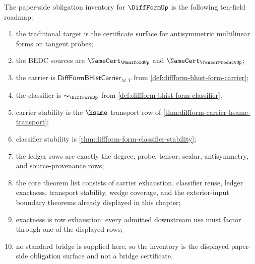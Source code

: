 \begin{definition}
\label{def:diffform-obligation-inventory}
The paper-side obligation inventory for $\DiffFormUp$ is the following
ten-field roadmap:
\begin{enumerate}
  \item the traditional target is the certificate surface for antisymmetric
  multilinear forms on tangent probes;
  \item the BEDC sources are $\NameCert_{\ManifoldUp}$ and
  $\NameCert_{\TensorProductUp}$;
  \item the carrier is
  $\mathsf{DiffFormBHistCarrier}_{M,T}$ from
  \autoref{def:diffform-bhist-form-carrier};
  \item the classifier is $\sim_{\DiffFormUp}$ from
  \autoref{def:diffform-bhist-form-classifier};
  \item carrier stability is the $\hsame$ transport row of
  \autoref{thm:diffform-carrier-hsame-transport};
  \item classifier stability is
  \autoref{thm:diffform-form-classifier-stability};
  \item the ledger rows are exactly the degree, probe, tensor, scalar,
  antisymmetry, and source-provenance rows;
  \item the core theorem list consists of carrier exhaustion, classifier
  reuse, ledger exactness, transport stability, wedge coverage, and the
  exterior-input boundary theorems already displayed in this chapter;
  \item exactness is row exhaustion: every admitted downstream use must factor
  through one of the displayed rows;
  \item no standard bridge is supplied here, so the inventory is the displayed
  paper-side obligation surface and not a bridge certificate.
\end{enumerate}
\end{definition}

